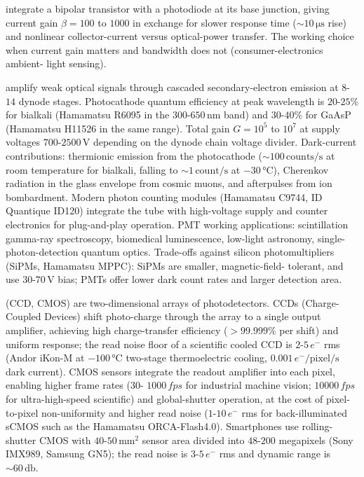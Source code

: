  integrate a bipolar transistor with a
photodiode at its base junction, giving current gain $\beta = 100$
to $1000$ in exchange for slower response time ($\sim 10\,\si{
\micro\second}$ rise) and nonlinear collector-current versus
optical-power transfer. The working choice when current gain
matters and bandwidth does not (consumer-electronics ambient-
light sensing).

 amplify weak optical signals
through cascaded secondary-electron emission at $8$-$14$ dynode
stages. Photocathode quantum efficiency at peak wavelength is
$20$-$25\%$ for bialkali (Hamamatsu R6095 in the $300$-$650\,\si{
\nano\meter}$ band) and $30$-$40\%$ for GaAsP (Hamamatsu H11526 in
the same range). Total gain $G = 10^{5}$ to $10^{7}$ at supply
voltages $700$-$2500\,\si{\volt}$ depending on the dynode chain
voltage divider. Dark-current contributions: thermionic emission
from the photocathode ($\sim 100\,\text{counts/s}$ at room
temperature for bialkali, falling to $\sim 1\,\text{count/s}$ at
$-30\,\si{\degreeCelsius}$), Cherenkov radiation in the glass
envelope from cosmic muons, and afterpulses from ion bombardment.
Modern photon counting modules (Hamamatsu C9744, ID Quantique
ID120) integrate the tube with high-voltage supply and counter
electronics for plug-and-play operation. PMT working
applications: scintillation gamma-ray spectroscopy, biomedical
luminescence, low-light astronomy, single-photon-detection
quantum optics. Trade-offs against silicon photomultipliers
(SiPMs, Hamamatsu MPPC): SiPMs are smaller, magnetic-field-
tolerant, and use $30$-$70\,\si{\volt}$ bias; PMTs offer lower
dark count rates and larger detection area.

 (CCD, CMOS) are two-dimensional arrays of
photodetectors. CCDs (Charge-Coupled Devices) shift photo-charge
through the array to a single output amplifier, achieving high
charge-transfer efficiency ($> 99.999\%$ per shift) and uniform
response; the read noise floor of a scientific cooled CCD is
$2$-$5\,e^{-}$ rms (Andor iKon-M at $-100\,\si{\degreeCelsius}$
two-stage thermoelectric cooling, $0.001\,e^{-}/\text{pixel}/
\text{s}$ dark current). CMOS sensors integrate the readout
amplifier into each pixel, enabling higher frame rates ($30$-
$1000\,\si{fps}$ for industrial machine vision; $10000\,\si{fps}$
for ultra-high-speed scientific) and global-shutter operation,
at the cost of pixel-to-pixel non-uniformity and higher read
noise ($1$-$10\,e^{-}$ rms for back-illuminated sCMOS such as the
Hamamatsu ORCA-Flash4.0). Smartphones use rolling-shutter CMOS
with $40$-$50\,\si{\milli\meter}^{2}$ sensor area divided into
$48$-$200$ megapixels (Sony IMX989, Samsung GN5); the read noise
is $3$-$5\,e^{-}$ rms and dynamic range is $\sim 60\,\si{
\decibel}$.

